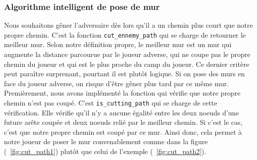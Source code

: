 \documentclass[a4paper]{article}
\begin{document}
\subsubsection{Algorithme intelligent de pose de mur}

Nous souhaitons gêner l'adversaire dès lors qu'il a un chemin plus court que notre propre chemin. C'est la fonction \texttt{cut\_ennemy\_path} qui se charge de retourner le meilleur mur. Selon notre définition propre, le meilleur mur est un mur qui augmente la distance parcourue par le joueur adverse, qui ne coupe pas le propre chemin du joueur et qui est le plus proche du camp du joueur. Ce dernier critère peut paraître surprenant, pourtant il est plutôt logique. Si on pose des murs en face du joueur adverse, on risque d'être gêner plus tard par ce même mur. \\

Premièrement, nous avons implémenté la fonction qui vérifie que notre propre chemin n'est pas coupé. C'est \texttt{is\_cutting\_path} qui se charge de cette vérification. Elle vérifie qu'il n'y a aucune égalité entre les deux noeuds d'une future arête coupée et deux noeuds relié par le meilleur chemin. Si c'est le cas, c'est que notre propre chemin est coupé par ce mur. Ainsi donc, cela permet à notre joueur de poser le mur convenablement comme dans la figure (~\ref{fig:cut_path1}) plutôt que celui de l'exemple (~\ref{fig:cut_path2}). \\
\end{document}
